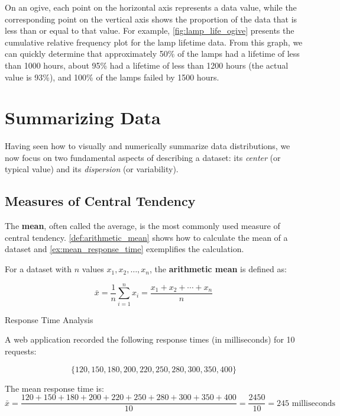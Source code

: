 On an ogive, each point on the horizontal axis represents a data value, while the corresponding point on the vertical axis shows the proportion of the data that is less than or equal to that value. For example, \autoref{fig:lamp_life_ogive} presents the cumulative relative frequency plot for the lamp lifetime data. From this graph, we can quickly determine that approximately 50\% of the lamps had a lifetime of less than 1000 hours, about 95\% had a lifetime of less than 1200 hours (the actual value is 93\%), and 100\% of the lamps failed by 1500 hours.

\section{Summarizing Data}
Having seen how to visually and numerically summarize data distributions, we now focus on two fundamental aspects of describing a dataset: its \emph{center} (or typical value) and its \emph{dispersion} (or variability).

\subsection*{Measures of Central Tendency}
The \textbf{mean}, often called the average, is the most commonly used measure of central tendency. \autoref{def:arithmetic_mean} shows how to calculate the mean of a dataset and \autoref{ex:mean_response_time} exemplifies the calculation.

\begin{definition} \label{def:arithmetic_mean}

For a dataset with $n$ values $x_1, x_2, \ldots, x_n$, the \textbf{arithmetic mean} is defined as:

$$
\bar{x} = \frac{1}{n}\sum_{i=1}^{n} x_i = \frac{x_1 + x_2 + \cdots + x_n}{n}
$$

\end{definition}


\begin{example} Response Time Analysis \label{ex:mean_response_time}

A web application recorded the following response times (in milliseconds) for 10 requests:

\[
\{120, 150, 180, 200, 220, 250, 280, 300, 350, 400\}
\]

The mean response time is:
\[
\bar{x} = \frac{120 + 150 + 180 + 200 + 220 + 250 + 280 + 300 + 350 + 400}{10} = \frac{2450}{10} = 245 \text{ milliseconds}
\]
\end{example}

